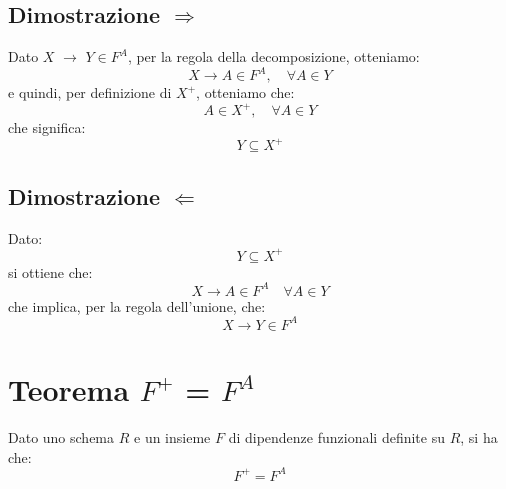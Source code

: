 \documentclass{article}
\begin{document}
\subsection{Dimostrazione $\Rightarrow$}

Dato $X$ $\rightarrow$ $Y \in F^{A}$, per la regola della decomposizione, otteniamo:
\begin{equation}
X \rightarrow A \in F^{A}, \quad \forall A \in Y  
\end{equation} 
e quindi, per definizione di $X^{+}$, otteniamo che: 
\begin{equation}
A \in X^{+}, \quad \forall A \in Y  
\end{equation}
che significa: 
\begin{equation}
Y \subseteq X^{+}
\end{equation}


\subsection{Dimostrazione $\Leftarrow$}
Dato: 
\begin{equation}
Y \subseteq X^{+}
\end{equation}
si ottiene che: 
\begin{equation}
X \rightarrow A \in F^{A} \quad \forall A \in Y
\end{equation}
che implica, per la regola dell'unione, che: 
\begin{equation}
X \rightarrow Y \in F^{A}
\end{equation}

\pagebreak
\section{Teorema $F^{+}$ = $F^{A}$}

Dato uno schema $R$ e un insieme $F$ di dipendenze funzionali definite su $R$, si ha che:
\begin{equation}
  F^{+} = F^{A}
\end{equation}
\end{document}
